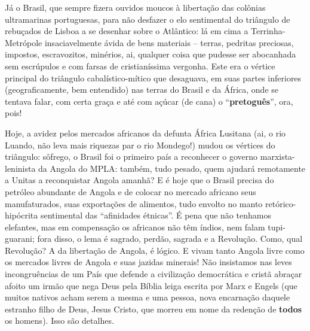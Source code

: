 \documentclass[
  letterpaper,
  DIV=11,
  numbers=noendperiod]{scrreprt}
\begin{document}
Já o Brasil, que sempre fizera ouvidos moucos à libertação das colônias
ultramarinas portuguesas, para não desfazer o elo sentimental do
triângulo de rebuçados de Lisboa a se desenhar sobre o Atlântico: lá em
cima a Terrinha-Metrópole insaciavelmente ávida de bens materiais --
terras, pedritas preciosas, impostos, escravozitos, minérios, ai,
qualquer coisa que pudesse ser abocanhada sem escrúpulos e com farsas de
cristianíssima vergonha. Este era o vértice principal do triângulo
cabalístico-mítico que desaguava, em suas partes inferiores
(geograficamente, bem entendido) nas terras do Brasil e da África, onde
se tentava falar, com certa graça e até com açúcar (de cana) o
``\textbf{pretoguês}'', ora, pois!

Hoje, a avidez pelos mercados africanos da defunta África Lusitana (ai,
o rio Luando, não leva mais riquezas par o rio Mondego!) mudou os
vértices do triângulo: sôfrego, o Brasil foi o primeiro país a
reconhecer o governo marxista-leninista da Angola do MPLA: também, tudo
pesado, quem ajudará remotamente a Unitas a reconquistar Angola amanhã?
E é hoje que o Brasil precisa do petróleo abundante de Angola e de
colocar no mercado africano seus manufaturados, suas exportações de
alimentos, tudo envolto no manto retórico-hipócrita sentimental das
``afinidades étnicas''. É pena que não tenhamos elefantes, mas em
compensação os africanos não têm índios, nem falam tupi-guarani; fora
disso, o lema é sagrado, perdão, sagrada e a Revolução. Como, qual
Revolução? A da libertação de Angola, é lógico. E vivam tanto Angola
livre como os mercados livres de Angola e suas jazidas minerais! Não
insistamos nas leves incongruências de um País que defende a civilização
democrática e cristã abraçar afoito um irmão que nega Deus pela Bíblia
leiga escrita por Marx e Engels (que muitos nativos acham serem a mesma
e uma pessoa, nova encarnação daquele estranho filho de Deus, Jesus
Cristo, que morreu em nome da redenção de \textbf{todos} os homens).
Isso são detalhes.
\end{document}
